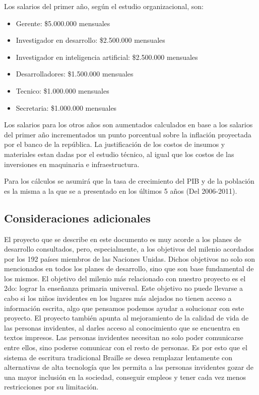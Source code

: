 \documentclass[a4paper, 12pt, oneside]{article}
\begin{document}
	Los salarios del primer año, según el estudio organizacional, son:
	\begin{itemize}
	\item Gerente: \$5.000.000 mensuales
	\item Investigador en desarrollo: \$2.500.000 mensuales
	\item Investigador en inteligencia artificial: \$2.500.000 mensuales
	\item Desarrolladores: \$1.500.000 mensuales
	\item Tecnico: \$1.000.000 mensuales
	\item Secretaria: \$1.000.000 mensuales
	\end{itemize}
	Los salarios para los otros años son aumentados calculados en base a los salarios del primer año incrementados un punto porcentual sobre la inflación proyectada por el banco de la república. La justificación de los costos de insumos y materiales estan dadas por el estudio técnico, al igual que los costos de las inversiones en maquinaria e infraestructura.
	
	Para los cálculos se asumirá que la tasa de crecimiento del PIB y de la población es la misma a la que se a presentado en los últimos 5 años (Del 2006-2011).
	
	\clearpage
	
	\begin{center}
	\section{Consideraciones adicionales}
	\end{center}

	El proyecto que se describe en este documento es muy acorde a los planes de desarrollo consultados, pero, especialmente, a los objetivos del milenio acordados por los 192 países miembros de las Naciones Unidas. Dichos objetivos no solo son mencionados en todos los planes de desarrollo, sino que son base fundamental de los mismos. El objetivo del milenio más relacionado con nuestro proyecto es el 2do: lograr la enseñanza primaria universal. Este objetivo no puede llevarse a cabo si los niños invidentes en los lugares más alejados no tienen acceso a información escrita, algo que pensamos podemos ayudar a solucionar con este proyecto.
	El proyecto también apunta al mejoramiento de la calidad de vida de las personas invidentes, al darles
	acceso al conocimiento que se encuentra en textos impresos. Las personas invidentes necesitan no solo
	poder comunicarse entre ellos, sino poderse comunicar con el resto de personas. Es por esto que el sistema
	de escritura tradicional Braille se desea remplazar lentamente con alternativas de alta tecnología
	que les permita a las personas invidentes gozar de una mayor inclusión en la sociedad, conseguir empleos
	y tener cada vez menos restricciones por su limitación.
	
\end{document}
